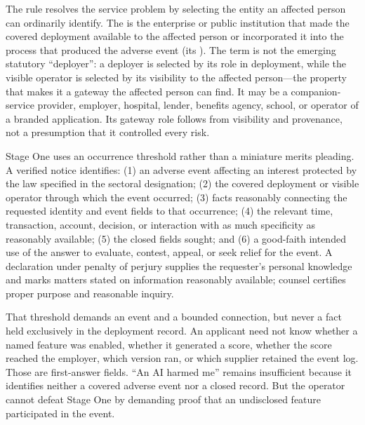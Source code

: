 The rule resolves the service problem by selecting the entity an affected person can ordinarily identify. The  is the enterprise or public institution that made the covered deployment available to the affected person or incorporated it into the process that produced the adverse event (its ). The term is not the emerging statutory ``deployer'': a deployer is selected by its role in deployment, while the visible operator is selected by its visibility to the affected person---the property that makes it a gateway the affected person can find. It may be a companion-service provider, employer, hospital, lender, benefits agency, school, or operator of a branded application. Its gateway role follows from visibility and provenance, not a presumption that it controlled every risk.

Stage One uses an occurrence threshold rather than a miniature merits pleading. A verified notice identifies: (1) an adverse event affecting an interest protected by the law specified in the sectoral designation; (2) the covered deployment or visible operator through which the event occurred; (3) facts reasonably connecting the requested identity and event fields to that occurrence; (4) the relevant time, transaction, account, decision, or interaction with as much specificity as reasonably available; (5) the closed fields sought; and (6) a good-faith intended use of the answer to evaluate, contest, appeal, or seek relief for the event. A declaration under penalty of perjury supplies the requester's personal knowledge and marks matters stated on information reasonably available; counsel certifies proper purpose and reasonable inquiry.

That threshold demands an event and a bounded connection, but never a fact held exclusively in the deployment record. An applicant need not know whether a named feature was enabled, whether it generated a score, whether the score reached the employer, which version ran, or which supplier retained the event log. Those are first-answer fields. ``An AI harmed me'' remains insufficient because it identifies neither a covered adverse event nor a closed record. But the operator cannot defeat Stage One by demanding proof that an undisclosed feature participated in the event.

